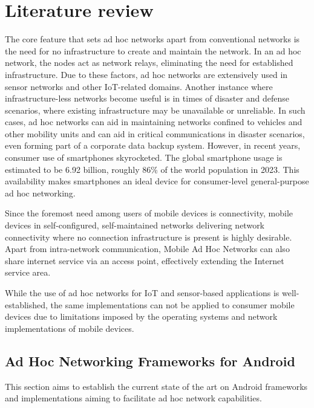 \section{Literature review}

The core feature that sets ad hoc networks apart from conventional networks is
the need for no infrastructure to create and maintain the network. In an ad hoc
network, the nodes act as network relays, eliminating the need for established
infrastructure. Due to these factors, ad hoc networks are extensively used in
sensor networks and other IoT-related domains\cite{akyildiz2002}. Another
instance where infrastructure-less networks become useful is in times of
disaster and defense scenarios, where existing infrastructure may be
unavailable or unreliable. In such cases, ad hoc networks can aid in
maintaining networks confined to vehicles and other mobility units and can aid
in critical communications in disaster scenarios, even forming part of a
corporate data backup system\cite{raza2016}.  However, in recent years,
consumer use of smartphones skyrocketed. The global smartphone usage is
estimated to be 6.92 billion, roughly 86\% of the world population in
2023\cite{zippia2023}. This availability makes smartphones an ideal device for
consumer-level general-purpose ad hoc networking\cite{soares2017}.

Since the foremost need among users of mobile devices is
connectivity\cite{chlamtac2003}, mobile devices in self-configured,
self-maintained networks delivering network connectivity where no connection
infrastructure is present is highly desirable\cite{chlamtac2003}. Apart from
intra-network communication, Mobile Ad Hoc Networks can also share internet
service via an access point, effectively extending the Internet service
area\cite{chlamtac2003}.

While the use of ad hoc networks for IoT and sensor-based applications is
well-established, the same implementations can not be applied to consumer
mobile devices due to limitations imposed by the operating systems and network
implementations of mobile devices.

\subsection{Ad Hoc Networking Frameworks for Android}

This section aims to establish the current state of the art on Android
frameworks and implementations aiming to facilitate ad hoc network
capabilities.

